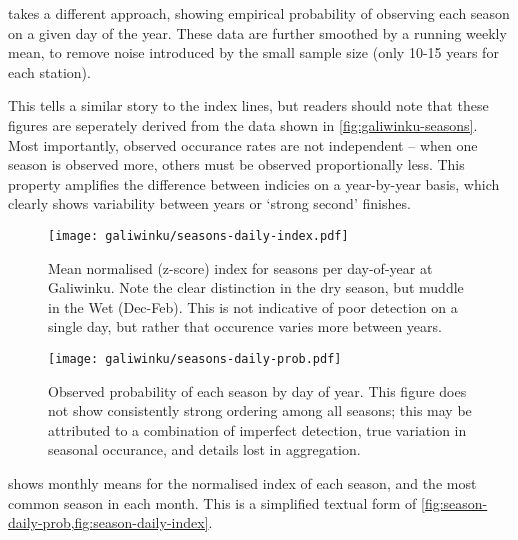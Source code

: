  takes a different approach, showing empirical
probability of observing each season on a given day of the year.  These
data are further smoothed by a running weekly mean, to remove noise
introduced by the small sample size (only 10-15 years for each station).

This tells a similar story to the index lines, but readers should note
that these figures are seperately derived from the data shown in
\cref{fig:galiwinku-seasons}.  Most importantly, observed occurance
rates are not independent -- when one season is observed more, others
must be observed proportionally less.  This property amplifies the
difference between indicies on a year-by-year basis, which clearly
shows variability between years or `strong second' finishes.


\begin{figure}[h]
    \centering
    \texttt{[image: galiwinku/seasons-daily-index.pdf]}
    \caption[Season index by day-of-year, Elcho Island]{
        Mean normalised (z-score) index for seasons per day-of-year
        at Galiwinku.  Note the clear distinction in the dry season,
        but muddle in the Wet (Dec-Feb).
        This is not indicative of poor detection on a single day,
        but rather that occurence varies more between years.
        }
    \label{fig:season-daily-index}
\end{figure}
\begin{figure}[h]
    \centering
    \texttt{[image: galiwinku/seasons-daily-prob.pdf]}
    \caption[Season probability by day-of-year, Elcho Island]{
        Observed probability of each season by day of year.
        This figure does not show consistently strong ordering among all
        seasons; this may be attributed to a combination of imperfect
        detection, true variation in seasonal occurance, and details
        lost in aggregation.
        }
    \label{fig:season-daily-prob}
\end{figure}


 shows monthly means for the normalised
index of each season, and the most common season in each month.  This is
a simplified textual form of \cref{fig:season-daily-prob,fig:season-daily-index}.


